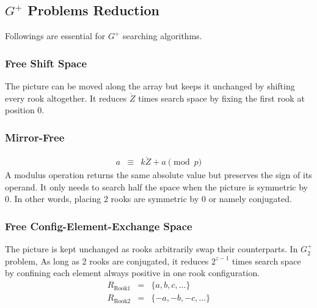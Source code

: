 \documentclass[twocolumn]{article}%
\theoremstyle{definition}
\theoremstyle{remark}
\begin{document}
\subsection*{$G^{+}$ Problems Reduction}
Followings are essential for $G^{+}$ searching algorithms.
\subsubsection*{Free Shift Space}
The picture can be moved along the array but keeps it unchanged by shifting every rook altogether. It reduces $\mathring{Z}$ times search space by fixing the first rook at position 0.
\subsubsection*{Mirror-Free}
\begin{eqnarray*}
	a&\equiv&k\mathring{Z}+a \pmod{p}
\end{eqnarray*}
A modulus operation returns the same absolute value but preserves the sign of its operand. It only needs to search half the space when the picture is symmetric by 0. In other words, placing 2 rooks are symmetric by 0 or namely conjugated.
\subsubsection*{Free Config-Element-Exchange Space}
The picture is kept unchanged as rooks arbitrarily swap their counterparts.
In $G_2^{+}$ problem, As long as 2 rooks are conjugated, it reduces $2^{\dot{z}-1}$ times search space by confining each element always positive in one rook configuration.
 \begin{eqnarray*}
 	R_{\textrm{Rook1}}&=&\{a,b,c,\dots\}\\
 	R_{\textrm{Rook2}}&=&\{-a,-b,-c,\dots\}
 \end{eqnarray*}
\end{document}
